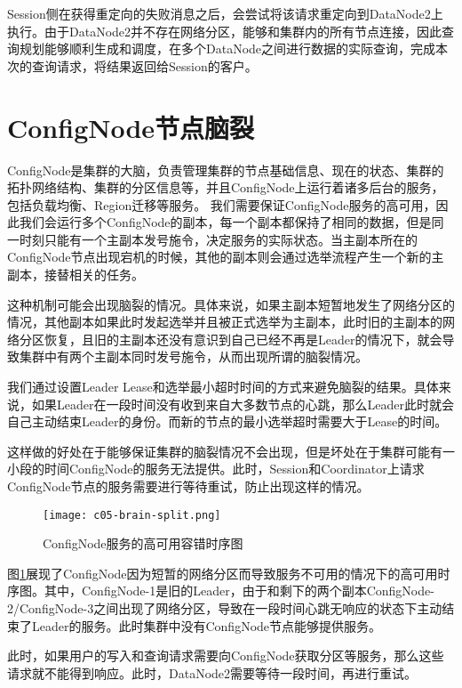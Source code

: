 Session侧在获得重定向的失败消息之后，会尝试将该请求重定向到DataNode2上执行。由于DataNode2并不存在网络分区，能够和集群内的所有节点连接，因此查询规划能够顺利生成和调度，在多个DataNode之间进行数据的实际查询，完成本次的查询请求，将结果返回给Session的客户。

\section{ConfigNode节点脑裂}

ConfigNode是集群的大脑，负责管理集群的节点基础信息、现在的状态、集群的拓扑网络结构、集群的分区信息等，并且ConfigNode上运行着诸多后台的服务，包括负载均衡、Region迁移等服务。
我们需要保证ConfigNode服务的高可用，因此我们会运行多个ConfigNode的副本，每一个副本都保持了相同的数据，但是同一时刻只能有一个主副本发号施令，决定服务的实际状态。当主副本所在的ConfigNode节点出现宕机的时候，其他的副本则会通过选举流程产生一个新的主副本，接替相关的任务。

这种机制可能会出现脑裂的情况。具体来说，如果主副本短暂地发生了网络分区的情况，其他副本如果此时发起选举并且被正式选举为主副本，此时旧的主副本的网络分区恢复，且旧的主副本还没有意识到自己已经不再是Leader的情况下，就会导致集群中有两个主副本同时发号施令，从而出现所谓的脑裂情况。


我们通过设置Leader Lease和选举最小超时时间的方式来避免脑裂的结果。具体来说，如果Leader在一段时间没有收到来自大多数节点的心跳，那么Leader此时就会自己主动结束Leader的身份。而新的节点的最小选举超时需要大于Lease的时间。

这样做的好处在于能够保证集群的脑裂情况不会出现，但是坏处在于集群可能有一小段的时间ConfigNode的服务无法提供。此时，Session和Coordinator上请求ConfigNode节点的服务需要进行等待重试，防止出现这样的情况。

\begin{figure}
    \centering
    \texttt{[image: c05-brain-split.png]}
    \caption{ConfigNode服务的高可用容错时序图}
    \label{fig:c05-brain-split}
\end{figure}

图\ref{fig:c05-brain-split}展现了ConfigNode因为短暂的网络分区而导致服务不可用的情况下的高可用时序图。其中，ConfigNode-1是旧的Leader，由于和剩下的两个副本ConfigNode-2/ConfigNode-3之间出现了网络分区，导致在一段时间心跳无响应的状态下主动结束了Leader的服务。此时集群中没有ConfigNode节点能够提供服务。

此时，如果用户的写入和查询请求需要向ConfigNode获取分区等服务，那么这些请求就不能得到响应。此时，DataNode2需要等待一段时间，再进行重试。

